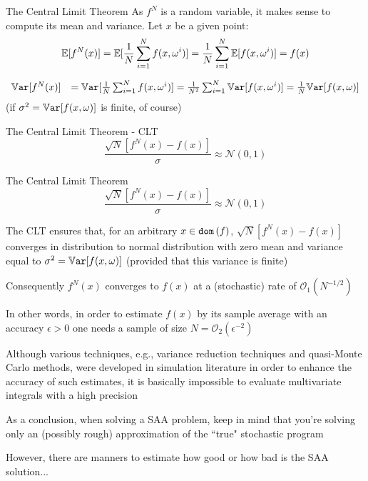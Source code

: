 \begin{frame}{The Central Limit Theorem }
 As $f^N$ is a random variable, it makes sense to compute its mean and variance. Let $x$ be a given point:
\[
\mathbb{E}[f^N(x)] = \mathbb{E}[\frac{1}{N}\sum_{i=1}^N f(x,\omega^i)]= \frac{1}{N}\sum_{i=1}^N \mathbb{E}[f(x,\omega^i)] =f(x)
\]

\pula
\[
\begin{array}{ll}
\mathbb{V}\texttt{ar}[f^N(x)]&= \mathbb{V}\texttt{ar}[\frac{1}{N}\sum_{i=1}^N f(x,\omega^i)]=  \frac{1}{N^2}\sum_{i=1}^N \mathbb{V}\texttt{ar}[f(x,\omega^i)]= \frac{1}{N} \mathbb{V}\texttt{ar}[f(x,\omega)]
\end{array}
\]
 (if $\sigma^2=\mathbb{V}\texttt{ar}[f(x,\omega)]$ is finite, of course)


\begin{block}{The Central Limit Theorem - CLT}
\[
\frac{\sqrt{N}[f^N(x) - f(x)]}{\sigma}\approx \mathcal{N}(0,1)
\]
\end{block}
 \end{frame} 
 

\begin{frame}{The Central Limit Theorem }
\[
\frac{\sqrt{N}[f^N(x) - f(x)]}{\sigma}\approx \mathcal{N}(0,1)
\]
\pula 

The CLT ensures that, for an arbitrary $x \in {\tt dom}\, (f)$, $\sqrt{N}[f^N(x) - f(x)]$
converges in distribution to normal distribution with zero mean and variance equal to $\sigma^2=\mathbb{V}\texttt{ar}[f(x,\omega)]$ (provided that this variance is finite)
\pula

Consequently $f^N(x)$ converges to $f(x)$ at a (stochastic) rate of $\mathcal{O}_1(N^{-1/2})$
\pula

In other words, in order to estimate $f(x)$ by its sample average with an
accuracy $\epsilon>0$ one needs a sample of size $N = \mathcal{O}_2(\epsilon^{-2})$
\pula 

Although various techniques, e.g., variance reduction techniques and quasi-Monte Carlo
methods, were developed in simulation literature in order to enhance the
accuracy of such estimates,  it is basically impossible to evaluate multivariate integrals with
a high precision
\pula

As a conclusion, when solving a SAA problem, keep in mind that you're solving only an (possibly rough) approximation of the ``true" stochastic program

\pula
However, there are manners to estimate how good or how bad is the SAA solution...

 \end{frame} 


